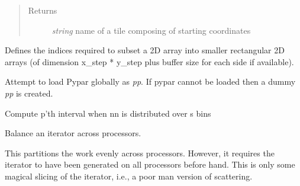 \documentclass[letterpaper,10pt,english]{sphinxmanual}
\begin{document}
\begin{fulllineitems}
\begin{fulllineitems}
\begin{quote}
\begin{description}
\item[{Returns}] \leavevmode
\emph{string} name of a tile composing of starting coordinates

\end{description}\end{quote}

\end{fulllineitems}



\begin{fulllineitems}
\label{docs/all_multipliers:all_multipliers.TileGrid.tile_grid}
Defines the indices required to subset a 2D array into smaller
rectangular 2D arrays (of dimension x\_step * y\_step plus buffer
size for each side if available).

\end{fulllineitems}


\end{fulllineitems}



\begin{fulllineitems}
\label{docs/all_multipliers:all_multipliers.attempt_parallel}
Attempt to load Pypar globally as \emph{pp}.  If pypar cannot be loaded then a
dummy \emph{pp} is created.

\end{fulllineitems}



\begin{fulllineitems}
\label{docs/all_multipliers:all_multipliers.balance}
Compute p'th interval when nn is distributed over s bins

\end{fulllineitems}



\begin{fulllineitems}
\label{docs/all_multipliers:all_multipliers.balanced}
Balance an iterator across processors.

This partitions the work evenly across processors. However, it requires
the iterator to have been generated on all processors before hand. This is
only some magical slicing of the iterator, i.e., a poor man version of
scattering.

\end{fulllineitems}
\end{document}

